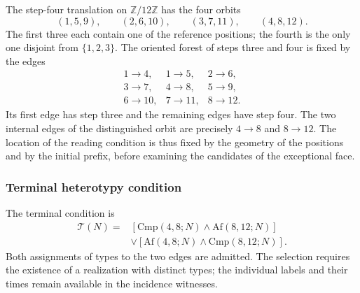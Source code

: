 The step-four translation on $\mathbb Z/12\mathbb Z$ has the
four orbits
\[
 (1,5,9),\qquad(2,6,10),\qquad(3,7,11),\qquad(4,8,12).
\]
The first three each contain one of the reference
positions; the fourth is the only one disjoint from $\{1,2,3\}$. The oriented
forest of steps three and four is fixed by the edges
\[
 \begin{array}{lll}
 1\to4,&1\to5,&2\to6,\\
 3\to7,&4\to8,&5\to9,\\
 6\to10,&7\to11,&8\to12.
 \end{array}
\]
Its first edge has step three and the remaining edges have step four. The two
internal edges of the distinguished orbit are precisely
$4\to8$ and $8\to12$. The location of the reading condition is thus
fixed by the geometry of the positions and by the initial prefix,
before examining the candidates of the exceptional face.

\subsubsection{Terminal heterotypy condition}

The terminal condition is
\begin{equation}
 \begin{split}
 \mathcal T(N)={}&
 [\mathrm{Cmp}(4,8;N)\wedge\mathrm{Af}(8,12;N)]\\
 &\vee[\mathrm{Af}(4,8;N)\wedge\mathrm{Cmp}(8,12;N)].
 \end{split}
 \label{act21:eq:kdes-heterotipia}
\end{equation}
Both assignments of types to the two edges are admitted. The
selection requires the existence of a realization with distinct types; the
individual labels and their times remain available in the
incidence witnesses.

